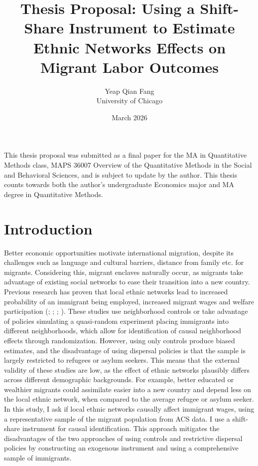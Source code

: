 \documentclass[11pt]{article}
\title{Thesis Proposal: Using a Shift-Share Instrument to Estimate Ethnic Networks Effects on Migrant Labor Outcomes}
\author{Yeap Qian Fang \\ University of Chicago}
\date{March 2026}
\begin{document}
\maketitle

This thesis proposal was submitted as a final paper for the MA in Quantitative Methods class, MAPS 36007 Overview of the Quantitative Methods in the Social and Behavioral Sciences, and is subject to update by the author. This thesis counts towards both the author's undergraduate Economics major and MA degree in Quantitative Methods. 

\section{Introduction}
Better economic opportunities motivate international migration, despite its challenges such as language and cultural barriers, distance from family etc. for migrants. Considering this, migrant enclaves naturally occur, as migrants take advantage of existing social networks to ease their transition into a new country. Previous research has proven that local ethnic networks lead to increased probability of an immigrant being employed, increased migrant wages and welfare participation (\cite{battisti_dynamic_2022}; \cite{damm_ethnic_2009}; \cite{edin_ethnic_2003}; \cite{bertrand_network_2000}). These studies use neighborhood controls or take advantage of policies simulating a quasi-random experiment placing immigrants into different neighborhoods, which allow for identification of causal neighborhood effects through randomization. However, using only controls produce biased estimates, and the disadvantage of using dispersal policies is that the sample is largely restricted to refugees or asylum seekers. This means that the external validity of these studies are low, as the effect of ethnic networks plausibly differs across different demographic backgrounds. For example, better educated or wealthier migrants could assimilate easier into a new country and depend less on the local ethnic network, when compared to the average refugee or asylum seeker. \\

In this study, I ask if local ethnic networks causally affect immigrant wages, using a representative sample of the migrant population from ACS data. I use a shift-share instrument for causal identification. This approach mitigates the disadvantages of the two approaches of using controls and restrictive dispersal policies by constructing an exogenous instrument and using a comprehensive sample of immigrants.  \\
\end{document}
